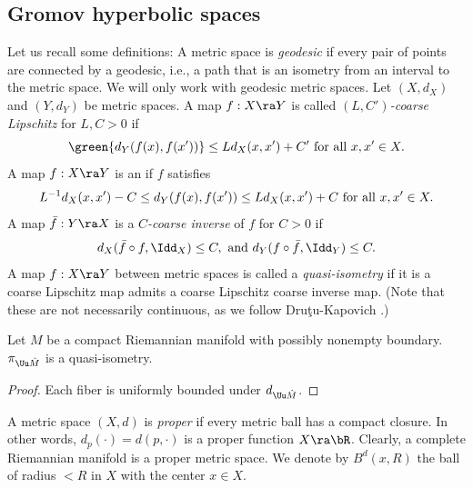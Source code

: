 
\subsection{Gromov hyperbolic spaces} \label{sub:Gromov} 


 Let us recall some definitions: 
A metric space is {\em geodesic} if every pair of points are connected by a geodesic, i.e., 
a path that is an isometry from an interval to the metric space.  
We will only work with geodesic metric spaces.
 Let $(X, d_X)$ and $(Y, d_Y)$ be metric spaces. A map $f: X \ra Y$ is called 
{\em  $(L, C')$-coarse Lipschitz} for $L, C > 0$ if 
 \[\green{d_Y(f(x), f(x'))} \leq L d_X(x, x') + C' \hbox{ for all } x, x' \in X.\] 
 A map $f: X \ra Y$ is an  if 
 $f$ satisfies 
 \[L^{-1} d_X(x, x') - C \leq d_Y(f(x), f(x')) \leq L d_X(x, x')  + C \hbox{ for all }x, x'\in X.\] 
 A map $\bar f: Y\ra X$ is a {\em $C$-coarse inverse} of $f$ 
 for $C > 0$ if 
\[d_X(\bar f \circ f, \Idd_X) \leq C, \hbox{ and }
d_Y(f\circ \bar f, \Idd_Y)\leq C.\]  
A map $f:X \ra Y$ between metric spaces is called 
 a {\em quasi-isometry} if it is a coarse Lipschitz map  admits a 
 coarse Lipschitz coarse inverse map.
(Note that these are not necessarily continuous, as we follow 
Dru\c{t}u-Kapovich \cite{DK2018}.) 

\begin{lemma} \label{lem:piUUM} 
Let $M$ be a compact Riemannian manifold with possibly nonempty boundary. 
	$\pi_{\Uu \hat M}$ is a quasi-isometry.
	\end{lemma} 
\begin{proof}
	Each fiber is uniformly bounded under $d_{\Uu \hat M}$.  
	\end{proof} 

 
A metric space $(X, d)$ is {\em proper} if every metric ball has a compact closure. 
In other words, $d_p(\cdot) = d(p, \cdot)$ is a proper function $X \ra \bR$. Clearly,
a complete Riemannian manifold is a proper metric space.
We denote by $B^d(x, R)$ the ball of radius $< R$ in $X$ with the center $x \in X$. 

